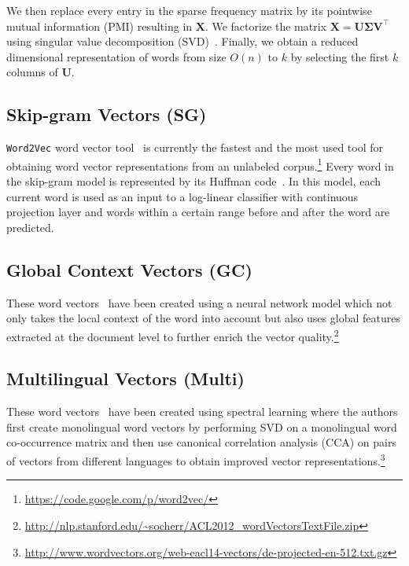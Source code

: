 \documentclass[11pt]{article}
\begin{document}
We then replace every entry in the sparse frequency matrix by 
its pointwise mutual information (PMI) \cite{Church:1990:WAN:89086.89095,Turney:2001:MWS:645328.650004}
resulting in $\boldsymbol{X}$.
We factorize the matrix $\boldsymbol{X} = \boldsymbol{U} \boldsymbol{\Sigma} \boldsymbol{V}^{\top}$ using singular value decomposition (SVD)~\cite{Golub:1996:MC:248979}. Finally, we obtain a reduced dimensional
representation of words from size $O(n)$ to $k$ by selecting the first $k$ columns of $\boldsymbol{U}$.

\subsection{Skip-gram Vectors (SG)}
\label{sec:sg}

\texttt{Word2Vec} word vector tool~\cite{mikolov2013efficient} is currently the fastest and 
the most used tool for obtaining word 
vector representations from an unlabeled 
corpus.\footnote{\url{https://code.google.com/p/word2vec/}}
Every word in the skip-gram model is represented by its Huffman code~\cite{citeulike:1320251}. In 
this model, each current word is used as an input to a log-linear classifier
with continuous projection layer and words within a certain range before and after the word
are predicted. 

\subsection{Global Context Vectors (GC)}
\label{sec:gc}

These word vectors~\cite{huang2012improving} have been created using a neural network model which not only takes the local context of the word into account but also uses global features extracted at the document level to further enrich the vector quality.\footnote{\url{http://nlp.stanford.edu/~socherr/ACL2012_wordVectorsTextFile.zip}}

\subsection{Multilingual Vectors (Multi)}
\label{sec:multi}

These word vectors~\cite{faruqui-dyer:2014:EACL2014} have been created using spectral learning where the authors first create monolingual word vectors by performing SVD on a monolingual word co-occurrence matrix and then use canonical correlation analysis (CCA) on pairs of vectors from different languages to obtain improved vector representations.\footnote{\url{http://www.wordvectors.org/web-eacl14-vectors/de-projected-en-512.txt.gz}}
\end{document}
